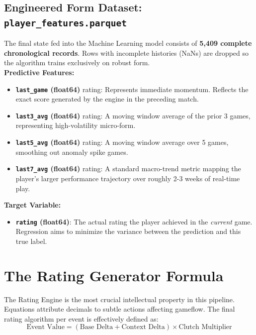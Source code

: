 \documentclass[12pt,a4paper]{article}
\begin{document}
\subsection{Engineered Form Dataset: \texttt{player\_features.parquet}}
The final state fed into the Machine Learning model consists of \textbf{5,409 complete chronological records}. Rows with incomplete histories (NaNs) are dropped so the algorithm trains exclusively on robust form.\\
\textbf{Predictive Features:}
\begin{itemize}
    \item \textbf{\texttt{last\_game} (float64)} rating: Represents immediate momentum. Reflects the exact score generated by the engine in the preceding match.
    \item \textbf{\texttt{last3\_avg} (float64)} rating: A moving window average of the prior 3 games, representing high-volatility micro-form.
    \item \textbf{\texttt{last5\_avg} (float64)} rating: A moving window average over 5 games, smoothing out anomaly spike games.
    \item \textbf{\texttt{last7\_avg} (float64)} rating: A standard macro-trend metric mapping the player's larger performance trajectory over roughly 2-3 weeks of real-time play.
\end{itemize}

\textbf{Target Variable:}
\begin{itemize}
    \item \textbf{\texttt{rating} (float64)}: The actual rating the player achieved in the \textit{current} game. Regression aims to minimize the variance between the prediction and this true label.
\end{itemize}

\section{The Rating Generator Formula}
The Rating Engine is the most crucial intellectual property in this pipeline. Equations attribute decimals to subtle actions affecting gameflow. The final rating algorithm per event is effectively defined as:
\[ \text{Event Value} = (\text{Base Delta} + \text{Context Delta}) \times \text{Clutch Multiplier} \]
\end{document}
